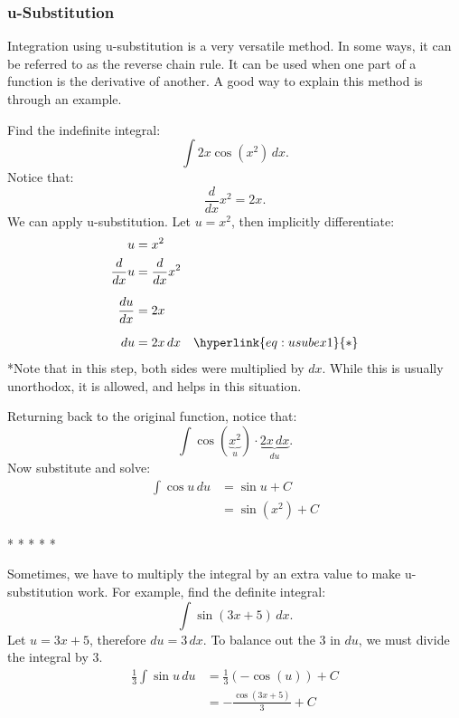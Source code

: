 \documentclass[12pt]{article}
\begin{document}
            \subsubsection{u-Substitution}
                Integration using u-substitution is a very versatile method. In some ways, it can be referred to as the reverse chain rule. It can be used when one part of a function is the derivative of another. A good way to explain this method is through an example.

                \noindent Find the indefinite integral:
                \[ \int 2x \cos(x^2) \, dx. \]
                \newline
                Notice that:
                \[ \frac{d}{dx} x^2 = 2x. \]
                We can apply u-substitution. Let $u = x^2$, then implicitly differentiate:
                \begin{align*}
                    u &= x^2 \\
                    \frac{d}{dx} u &= \frac{d}{dx} x^2 \\[6pt]
                    \frac{du}{dx} &= 2x \\[6pt]
                    du &= 2x \, dx \quad \hyperlink{eq:usubex1}{*}
                \end{align*}
                \hypertarget{eq:usubex1}{*}Note that in this step, both sides were multiplied by $dx$. While this is usually unorthodox, it is allowed, and helps in this situation.
                \bigskip

                \noindent Returning back to the original function, notice that:
                \[ \int \cos(\underbrace{x^2}_{u}) \cdot \underbrace{2x \, dx}_{du}. \]
                Now substitute and solve:
                \begin{align*}
                    \int \cos{u} \, du &= \sin{u} + C\\
                    &= \sin(x^2) + C
                \end{align*}
                \begin{center}
                    * * * * *
                \end{center}

                Sometimes, we have to multiply the integral by an extra value to make u-substitution work. For example, find the definite integral:
                \[ \int \sin(3x+5) \, dx. \]
                Let $u = 3x+5$, therefore $du = 3 \, dx$. To balance out the $3$ in $du$, we must divide the integral by $3$.
                \begin{align*}
                    \frac{1}{3} \int \sin{u} \, du &= \frac{1}{3} \left( -\cos(u) \right) + C \\[6pt]
                    &= -\frac{\cos(3x+5)}{3} + C
                \end{align*}
\end{document}
